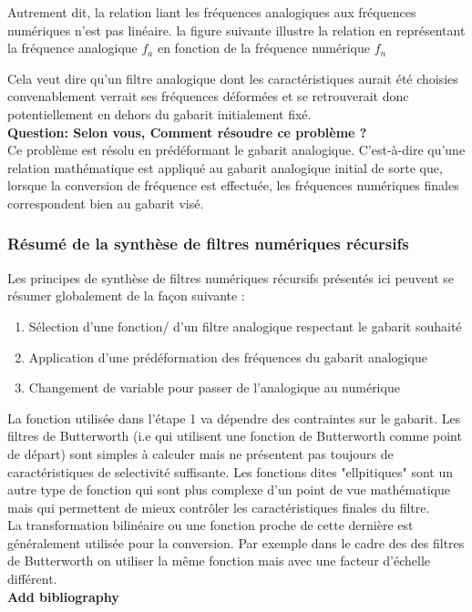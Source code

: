 \documentclass[11pt,a4paper]{article}
\begin{document}
Autrement dit, la relation liant les fréquences analogiques aux fréquences numériques n'est pas linéaire. la figure suivante illustre la relation en représentant la fréquence analogique $f_a$ en fonction de la fréquence numérique $f_n$

\begin{center}
\end{center}

Cela veut dire qu'un filtre analogique dont les caractéristiques aurait été choisies convenablement verrait ses fréquences déformées et se retrouverait donc potentiellement en dehors du gabarit initialement fixé.\\

\textbf{Question: Selon vous, Comment résoudre ce problème ?}\\

Ce problème  est résolu en prédéformant le gabarit analogique. C'est-à-dire qu'une relation mathématique est appliqué au gabarit analogique initial de sorte que, lorsque la conversion de fréquence est effectuée, les fréquences numériques finales correspondent bien au gabarit visé.\\

\subsubsection{Résumé de la synthèse de filtres numériques récursifs}
Les principes de synthèse de filtres numériques récursifs présentés ici peuvent se résumer globalement de la façon suivante :\\

\begin{enumerate}
\item Sélection d'une fonction/ d'un filtre analogique respectant le gabarit souhaité
\item Application d'une prédéformation des fréquences du gabarit analogique
\item Changement de variable pour passer de l'analogique au numérique
\end{enumerate}

La fonction utilisée dans l'étape 1 va dépendre des contraintes sur le gabarit. Les filtres de Butterworth (i.e qui utilisent une fonction de Butterworth comme point de départ) sont simples à calculer mais ne présentent pas toujours de caractéristiques de selectivité suffisante. Les fonctions dites "ellpitiques" sont un autre type de fonction qui sont plus complexe d'un point de vue mathématique mais qui permettent de mieux contrôler les caractéristiques finales du filtre.\\

La transformation bilinéaire ou une fonction proche de cette dernière est généralement utilisée pour la conversion. Par exemple dans le cadre des des filtres de Butterworth on utiliser la même fonction mais avec une facteur d'échelle différent.\\

\textbf{Add bibliography \label{**BIBLIO!}}
 
\end{document}
